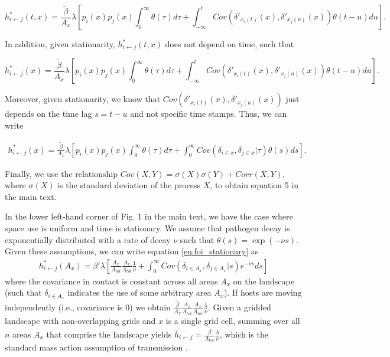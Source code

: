 \documentclass[11pt]{article}
\begin{document}
$$
h^*_{i \leftarrow j}(t, x) = \frac{\tilde{\beta}}{A_x} \lambda \left[p_i(x) p_j(x) \int_0^\infty \theta(\tau) d\tau  + \int_{-\infty}^t Cov(\delta'_{x_i(t)}(x), \delta'_{x_j(u)}(x)) \theta(t - u) du\right].
$$

In addition, given stationarity, $h^*_{i \leftarrow j}(t, x)$ does not depend on time, such that 

$$
h^*_{i \leftarrow j}(x) = \frac{\tilde{\beta}}{A_x} \lambda \left[p_i(x) p_j(x) \int_0^\infty \theta(\tau) d\tau  + \int_{-\infty}^t Cov(\delta'_{x_i(t)}(x), \delta'_{x_j(u)}(x)) \theta(t - u) du\right].
$$

Moreover, given stationarity, we know that $Cov(\delta'_{x_i(t)}(x), \delta'_{x_j(u)}(x))$ just depends on the time lag $s = t - u$ and not specific time stamps. Thus, we can write

\begin{equation}
    \begin{aligned}
   h^*_{i \leftarrow j}(x) = \frac{\tilde{\beta}}{A_x} \lambda \left[p_i(x)p_j(x) \int_0^\infty \theta(\tau) d\tau + \int_{0}^{\infty} Cov(\delta_{i \in x}, \delta_{j \in x} | \tau) \theta(s) ds\right].
    \end{aligned}
    \label{eq:foi_stationary}
\end{equation}

Finally, we use the relationship $Cov(X,Y)=\sigma(X)\sigma(Y)+Corr(X,Y)$, where $\sigma(X)$ is the standard deviation of the process $X$, to obtain equation 5 in the main text.

In the lower left-hand corner of Fig. 1 in the main text, we have the case where space use is uniform and time is stationary. We assume that pathogen decay is exponentially distributed with a rate of decay $\nu$ such that $\theta(s) = \exp(-\nu s)$. Given these assumptions, we can write equation \ref{eq:foi_stationary} as
\begin{equation}
    \begin{aligned}
        h^*_{i \leftarrow j}(A_x) = \beta' \lambda \left[\frac{A_x}{A_{tot}}\frac{A_x}{A_{tot}} \frac{1}{\nu} +  \int_{0}^{\infty} Cov(\delta_{i \in A_x}, \delta_{j \in A_x} | s) e^{-\nu s} ds\right]
    \end{aligned}
    \label{eq:uniform_stationary1}
\end{equation}
where the covariance in contact is constant across all areas $A_x$ on the landscape (such that $\delta_{i \in A_x}$ indicates the use of some arbitrary area $A_x$).  
If hosts are moving independently (i.e., covariance is 0) we obtain $\frac{\tilde{\beta}}{A_x} \frac{A_x}{A_{tot}} \frac{A_x}{A_{tot}}  \frac{\lambda}{\nu}$. Given a gridded landscape with non-overlapping grids and $x$ is a single grid cell, summing over all $n$ areas $A_x$ that comprise the landscape yields $\bar{h}_{i \leftarrow j} =\frac{\tilde{\beta}}{A_\text{tot}} \frac{\lambda}{\nu}$, which is the standard mass action assumption of transmission \citep{McCallum2001}. 
\end{document}
